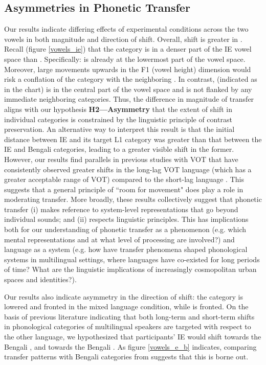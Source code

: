 \documentclass[12 pt]{article}
\newcommand{\nt}[1]{\textipa{[#1]}} %
\begin{document}
\subsection{Asymmetries in Phonetic Transfer}

Our results indicate differing effects of experimental conditions across the two vowels in both magnitude and direction of shift. Overall, shift is greater in \nt{2}. Recall (figure \ref{vowels_ie}) that the category \nt{\ae} is in a denser part of the IE vowel space than \nt{2}. Specifically: \nt{\ae} is already at the lowermost part of the vowel space. Moreover, large movements upwards in the F1 (vowel height) dimension would risk a conflation of the category with the neighboring \nt{E}. In contrast, \nt{2} (indicated as \nt{@} in the chart) is in the central part of the vowel space and is not flanked by any immediate neighboring categories. Thus, the difference in magnitude of transfer aligns with our hypothesis \textbf{H2---Asymmetry} that the extent of shift in individual categories is constrained by the linguistic principle of contrast preservation. An alternative way to interpret this result is that the initial distance between IE \nt{2} and its target L1 category \nt{a:} was greater than that between the IE and Bengali \nt{\ae} categories, leading to a greater visible shift in the former. However, our results find parallels in previous studies with VOT that have consistently observed greater shifts in the long-lag VOT language (which has a greater acceptable range of VOT) compared to the short-lag language \citep[e.g.][]{antoniou2011inter, bullock2009trying}. This suggests that a general principle of ``room for movement" does play a role in moderating transfer. More broadly, these results collectively suggest that phonetic transfer (i) makes reference to system-level representations that go beyond individual sounds; and (ii) respects linguistic principles. This has implications both for our understanding of phonetic transfer as a phenomenon (e.g. which mental representations and at what level of processing are involved?) and language as a system (e.g. how have transfer phenomena shaped phonological systems in multilingual settings, where languages have co-existed for long periods of time? What are the linguistic implications of increasingly cosmopolitan urban spaces and identities?).

Our results also indicate asymmetry in the direction of shift: the category \nt{2} is lowered and fronted in the mixed language condition, while \nt{\ae} is fronted. On the basis of previous literature indicating that both long-term and short-term shifts in phonological categories of multilingual speakers are targeted with respect to the other language, we hypothesized that participants' IE \nt{\ae} would shift towards the Bengali \nt{\ae}, and \nt{2} towards the Bengali \nt{a:}. As figure \ref{vowels_e_b} indicates, comparing transfer patterns with Bengali categories from \cite{shruticorpus} suggests that this is borne out.
\end{document}
